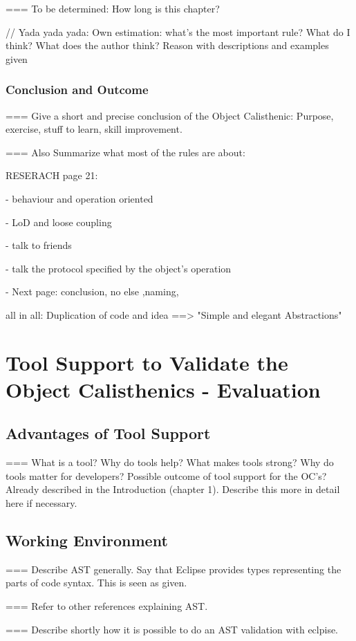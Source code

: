 === To be determined: How long is this chapter?

\begin{itshape}
// Yada yada yada: 
Own estimation: what's the most important rule? 
What do I think?
What does the author think? 
Reason with descriptions and examples given
\end{itshape}

\subsection{Conclusion and Outcome}
=== Give a short and precise conclusion of the Object Calisthenic: Purpose, exercise, stuff to learn, skill improvement. 

=== Also Summarize what most of the rules are about: 

RESERACH page 21: 

- behaviour and operation oriented

- LoD and loose coupling

- talk to friends

- talk the protocol specified by the object's operation

- Next page: conclusion, no else ,naming, 

all in all: Duplication of code and idea
==> "Simple and elegant Abstractions"


\chapter{Tool Support to Validate the Object Calisthenics - Evaluation}
\label{Evaluation}
\section{Advantages of Tool Support}
\label{e:advantages}
=== What is a tool? Why do tools help? What makes tools strong? Why do tools matter for developers?
Possible outcome of tool support for the OC's? Already described in the Introduction (chapter 1). Describe this more in detail here if necessary. 
\section{Working Environment}
=== Describe AST generally. Say that Eclipse provides types representing the parts of code syntax. This is seen as given. 

=== Refer to other references explaining AST.

=== Describe shortly how it is possible to do an AST validation with eclpise. 


